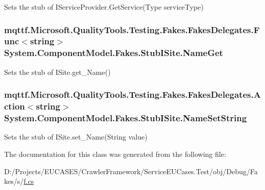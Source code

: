 Sets the stub of I\-Service\-Provider.\-Get\-Service(\-Type service\-Type)

\hypertarget{class_system_1_1_component_model_1_1_fakes_1_1_stub_i_site_a65cb89c9cf0517bd790599e117de6dd4}{
\subsubsection[{Name\-Get}]{\setlength{\rightskip}{0pt plus 5cm}mqttf.\-Microsoft.\-Quality\-Tools.\-Testing.\-Fakes.\-Fakes\-Delegates.\-Func$<$string$>$ System.\-Component\-Model.\-Fakes.\-Stub\-I\-Site.\-Name\-Get}}\label{class_system_1_1_component_model_1_1_fakes_1_1_stub_i_site_a65cb89c9cf0517bd790599e117de6dd4}


Sets the stub of I\-Site.\-get\-\_\-\-Name()

\hypertarget{class_system_1_1_component_model_1_1_fakes_1_1_stub_i_site_a8471a5ff72f42fdf92413622716bb6a0}{
\subsubsection[{Name\-Set\-String}]{\setlength{\rightskip}{0pt plus 5cm}mqttf.\-Microsoft.\-Quality\-Tools.\-Testing.\-Fakes.\-Fakes\-Delegates.\-Action$<$string$>$ System.\-Component\-Model.\-Fakes.\-Stub\-I\-Site.\-Name\-Set\-String}}\label{class_system_1_1_component_model_1_1_fakes_1_1_stub_i_site_a8471a5ff72f42fdf92413622716bb6a0}


Sets the stub of I\-Site.\-set\-\_\-\-Name(\-String value)



The documentation for this class was generated from the following file\-:\begin{DoxyCompactItemize}
\item 
D\-:/\-Projects/\-E\-U\-C\-A\-S\-E\-S/\-Crawler\-Framework/\-Service\-E\-U\-Cases.\-Test/obj/\-Debug/\-Fakes/s/\hyperlink{s_2f_8cs}{f.\-cs}\end{DoxyCompactItemize}
